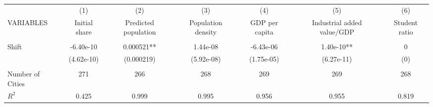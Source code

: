 \begin{tabular}{lcccccc} \hline
 & (1) & (2) & (3) & (4) & (5) & (6) \\
VARIABLES & Initial share & Predicted population & Population density & GDP per capita & Industrial added value/GDP & Student ratio \\ \hline
 &  &  &  &  &  &  \\
Shift & -6.40e-10 & 0.000521** & 1.44e-08 & -6.43e-06 & 1.40e-10** & 0 \\
 & (4.62e-10) & (0.000219) & (5.92e-08) & (1.75e-05) & (6.27e-11) & (0) \\
 &  &  &  &  &  &  \\
Number of Cities & 271 & 266 & 268 & 269 & 269 & 268 \\
 $ R^2$ & 0.425 & 0.999 & 0.995 & 0.956 & 0.955 & 0.819 \\ \hline
\end{tabular}
